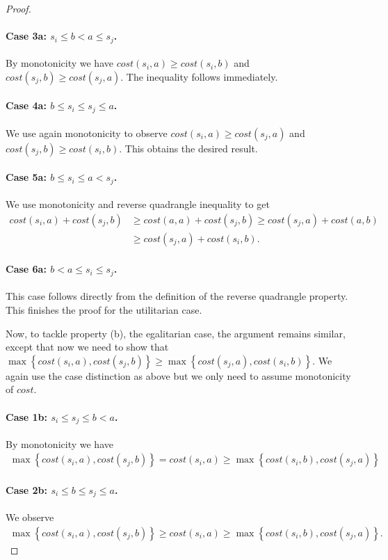 \documentclass[a4paper]{article}
\newcommand{\cost}{\mathit{cost}}
\begin{document}
\begin{proof}
\paragraph*{Case 3a: $s_i \leq b < a \leq s_j$.}
By monotonicity we have $\cost(s_i,a)\geq \cost(s_i,b)$ and $\cost(s_j,b) \geq \cost(s_j,a)$. The inequality follows immediately.
\paragraph*{Case 4a: $b \leq s_i \leq s_j \leq a$.}
We use again monotonicity to observe $\cost(s_i,a) \geq \cost(s_j,a)$ and $\cost(s_j,b) \geq \cost(s_i,b)$. This obtains the desired result.
\paragraph*{Case 5a: $b \leq s_i \leq a < s_j$.}
We use monotonicity and reverse quadrangle inequality to get
\begin{align*}
    \cost(s_i,a) + \cost(s_j,b) &\geq \cost(a,a) + \cost(s_j,b) \geq \cost(s_j,a) + \cost(a,b)\\
    &\geq \cost(s_j,a) + \cost(s_i,b).
\end{align*}
\paragraph*{Case 6a: $b < a \leq s_i \leq s_j$.}
This case follows directly from the definition of the reverse quadrangle property. This finishes the proof for the utilitarian case.

Now, to tackle property (b), the egalitarian case, the argument remains similar, except that now we need to show that $\max \left\{\cost(s_i,a), \cost(s_j,b)\right\} \geq \max \left\{\cost(s_j,a), \cost(s_i,b)\right\}$. We again use the case distinction as above but we only need to assume monotonicity of $\cost$.

\paragraph*{Case 1b: $s_i \leq s_j \leq b < a$.}
 By monotonicity we have
 \begin{align*}
     \max \left\{\cost(s_i,a), \cost(s_j,b)\right\} = \cost(s_i,a) \geq \max\left\{\cost(s_i, b), \cost(s_j,a)\right\}
 \end{align*}
\paragraph*{Case 2b: $s_i \leq b \leq s_j \leq a$.}
We observe
 \begin{align*}
     \max \left\{\cost(s_i,a), \cost(s_j,b)\right\} \geq \cost(s_i,a) \geq \max\left\{\cost(s_i, b), \cost(s_j,a)\right\}.
 \end{align*}

\end{proof}
\end{document}
